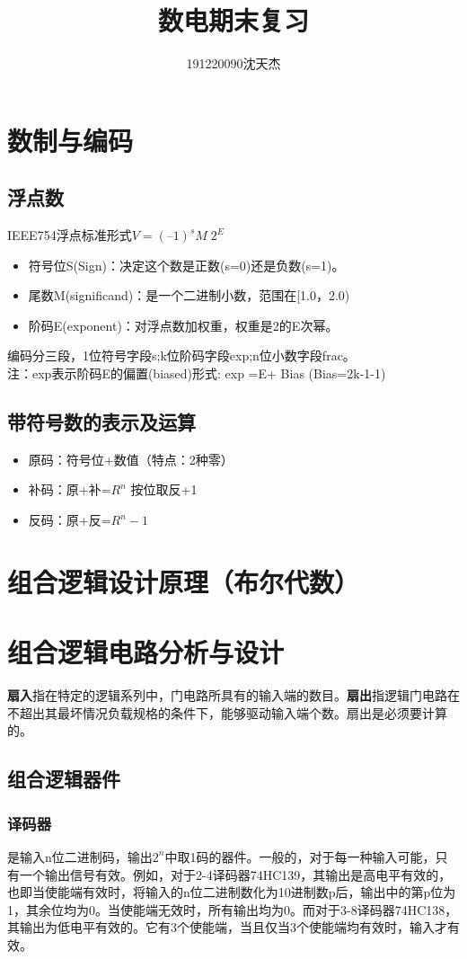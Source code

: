 \documentclass{article}
\title{数电期末复习}
\author{191220090沈天杰}
\begin{document}
	\maketitle
	\tableofcontents
	\newpage
	\section{数制与编码}
	\subsection{浮点数}
	IEEE754浮点标准形式$V=(–1)^s M \; 2^E$
	\begin{itemize}
		\item 符号位S(Sign)：决定这个数是正数(s=0)还是负数(s=1)。
		\item 尾数M(significand)：是一个二进制小数，范围在[1.0，2.0)
		\item 阶码E(exponent)：对浮点数加权重，权重是2的E次幂。
	\end{itemize}
	编码分三段，1位符号字段s;k位阶码字段exp;n位小数字段frac。\\
	注：exp表示阶码E的偏置(biased)形式: exp =E+ Bias (Bias=2k-1-1)\\
	\subsection{带符号数的表示及运算}
	\begin{itemize}
		\item 原码：符号位+数值（特点：2种零）
		\item 补码：原+补=$R^n$ 按位取反+1
		\item 反码：原+反=$R^n-1$
	\end{itemize}
	\section{组合逻辑设计原理（布尔代数）}
	\section{组合逻辑电路分析与设计}
	\textbf{扇入}指在特定的逻辑系列中，门电路所具有的输入端的数目。\textbf{扇出}指逻辑门电路在不超出其最坏情况负载规格的条件下，能够驱动输入端个数。扇出是必须要计算的。
	\subsection{组合逻辑器件}
	\subsubsection{译码器}
	是输入n位二进制码，输出$2^n$中取1码的器件。一般的，对于每一种输入可能，只有一个输出信号有效。例如，对于2-4译码器74HC139，其输出是高电平有效的，也即当使能端有效时，将输入的n位二进制数化为10进制数p后，输出中的第p位为1，其余位均为0。当使能端无效时，所有输出均为0。而对于3-8译码器74HC138，其输出为低电平有效的。它有3个使能端，当且仅当3个使能端均有效时，输入才有效。
\end{document}
